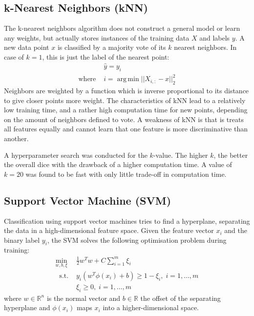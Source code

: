 \documentclass[journal]{IEEEtran}
\DeclareMathOperator*{\argmin}{arg\,min}
\begin{document}
\subsection{k-Nearest Neighbors (kNN)}
The k-nearest neighbors algorithm does not construct a general model or learn any weights, but actually stores instances of the training data $X$ and labels $y$. A new data point $x$ is classified by a majority vote of its $k$ nearest neighbors. In case of $k=1$, this is just the label of the nearest point:
\begin{equation}
\begin{split}
& \hat{y} = y_i \\
\text{where } & i = \argmin ||X_{i,:} - x||_2^2
\end{split}
\end{equation}
Neighbors are weighted by a function which is inverse proportional to its distance to give closer points more weight. The characteristics of kNN lead to a relatively low training time, and a rather high computation time for new points, depending on the amount of neighbors defined to vote. A weakness of kNN is that is treats all features equally and cannot learn that one feature is more discriminative than another.

A hyperparameter search was conducted for the $k$-value. The higher $k$, the better the overall dice with the drawback of a higher computation time. A value of $k=20$ was found to be fast with only little trade-off in computation time.

\subsection{Support Vector Machine (SVM)}
Classification using support vector machines tries to find a hyperplane, separating the data in a high-dimensional feature space. Given the feature vector $x_i$ and the binary label $y_i$, the SVM solves the following optimisation problem during training:
\begin{equation}
\begin{split}
\min_{w, b, \xi} \ & \frac{1}{2}w^Tw + C\sum_{i=1}^m \xi_i \\
\ \text{ s.t. } & y_i(w^T\phi(x_i)+b) \geq 1-\xi_i, \; i = 1, \ldots, m \\
& \xi_i \geq 0, \; i = 1, \ldots, m
\end{split}
\end{equation}
where $w\in \mathbb{R}^n $ is the normal vector and $b \in \mathbb{R}$ the offset of the separating hyperplane and $\phi(x_i)$ maps $x_i$ into a higher-dimensional space.
\end{document}
